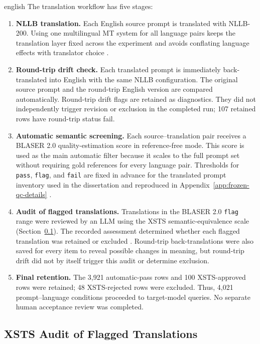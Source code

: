 \begin{otherlanguage*}{english}
The translation workflow has five stages:
\begin{enumerate}[label=\arabic*.]
    \item \textbf{NLLB translation.} Each English source prompt is translated with NLLB-200. Using one multilingual MT system for all language pairs keeps the translation layer fixed across the experiment and avoids conflating language effects with translator choice \cite{NLLBTeamScalingNeuralMachine2024}.
    \item \textbf{Round-trip drift check.} Each translated prompt is immediately back-translated into English with the same NLLB configuration. The original source prompt and the round-trip English version are compared automatically. Round-trip drift flags are retained as diagnostics. They did not independently trigger revision or exclusion in the completed run; 107 retained rows have round-trip status fail.
    \item \textbf{Automatic semantic screening.} Each source--translation pair receives a BLASER 2.0 quality-estimation score in reference-free mode. This score is used as the main automatic filter because it scales to the full prompt set without requiring gold references for every language pair. Thresholds for \texttt{pass}, \texttt{flag}, and \texttt{fail} are fixed in advance for the translated prompt inventory used in the dissertation and reproduced in Appendix~\ref{app:frozen-qc-details} \cite{daleBLASER2024}.
	\item \textbf{Audit of flagged translations.} Translations in the BLASER 2.0 \texttt{flag} range were reviewed by an LLM using the XSTS semantic-equivalence scale (Section~\ref{sec:xsts-audit}). The recorded assessment determined whether each flagged translation was retained or excluded \cite{lichtConsistentHumanEvaluation2022}. Round-trip back-translations were also saved for every item to reveal possible changes in meaning, but round-trip drift did not by itself trigger this audit or determine exclusion.
    \item \textbf{Final retention.} The 3,921 automatic-pass rows and 100 XSTS-approved rows were retained; 48 XSTS-rejected rows were excluded. Thus, 4,021 prompt--language conditions proceeded to target-model queries. No separate human acceptance review was completed.
\end{enumerate}

\subsection{XSTS Audit of Flagged Translations}
\label{sec:xsts-audit}


\end{otherlanguage*}
